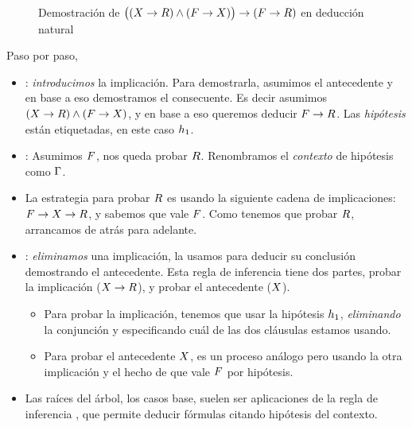 \begin{ejemplo}
\begin{figure}[H]
        \caption{Demostración de \(
        \big(
            (X \to R) \wedge (F \to X)
        \big)
        \to
        (F \to R)
    \) en deducción natural}
        \label{nd:fig:proof-exam-nd}
    \end{figure}

    Paso por paso,

    \begin{itemize}
        \item {}: \textit{introducimos} la implicación. Para demostrarla,
        asumimos el antecedente y en base a eso demostramos el consecuente. Es
        decir asumimos $(X \to R) \wedge (F \to
        X)$, y en base a eso queremos deducir $F \to R$.
        Las \textit{hipótesis} están etiquetadas, en este caso $h_1$.
        \item {}: Asumimos $F$, nos queda probar $R$.
        Renombramos el \textit{contexto} de hipótesis como $\Gamma$.
        \item La estrategia para probar $R$ es usando la siguiente cadena
        de implicaciones: $F \to X \to R$, y sabemos que
        vale $F$. Como tenemos que probar $R$, arrancamos de atrás para
        adelante.
        \item {}: \textit{eliminamos} una implicación, la usamos para
        deducir su conclusión demostrando el antecedente. Esta regla de
        inferencia tiene dos partes, probar la implicación ($X \to
        R$), y probar el antecedente ($X$).
        \begin{itemize}
            \item Para probar la implicación, tenemos que usar la hipótesis
            $h_1$, \textit{eliminando} la conjunción y especificando cuál
            de las dos cláusulas estamos usando.
            \item Para probar el antecedente $X$, es un proceso análogo
            pero usando la otra implicación y el hecho de que vale $F$ por hipótesis.
        \end{itemize}
        \item Las raíces del árbol, los casos base, suelen ser aplicaciones de
        la regla de inferencia , que permite deducir fórmulas citando
        hipótesis del contexto.
    \end{itemize}
\end{ejemplo}


